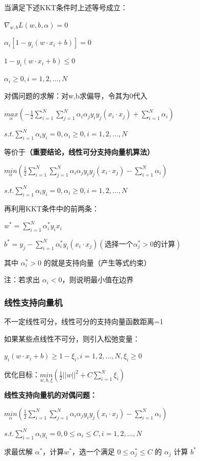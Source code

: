 \documentclass[b4paper, 10pt]{ctexart}
\begin{document}
\begin{multicols}{3}
当满足下述KKT条件时上述等号成立：

$\nabla_{w,b} L(w,b,\alpha) = 0$

$\alpha_i[1-y_i(w\cdot x_i+b)]=0$

$1-y_i(w\cdot x_i+b)\le 0$

$\alpha_i \ge 0, i=1,2,\dots,N$


对偶问题的求解：对w,b求偏导，令其为0代入

$
\underset{\alpha}{max} (-\frac{1}{2}\sum_{i=1}^N \sum_{j=1}^N \alpha_i \alpha_j y_iy_j (x_i\cdot x_j) + \sum_{i=1}^N \alpha_i
)$

$
s.t. \sum_{i=1}^N \alpha_iy_i=0, \alpha_i\ge 0,i=1,2,\dots,N
$

等价于\textbf{（重要结论，线性可分支持向量机算法）}

$
\underset{\alpha}{min} (\frac{1}{2}\sum_{i=1}^N \sum_{j=1}^N \alpha_i \alpha_j y_iy_j (x_i\cdot x_j) - \sum_{i=1}^N \alpha_i
)$

$
s.t. \sum_{i=1}^N \alpha_iy_i=0, \alpha_i\ge 0,i=1,2,\dots,N
$

再利用KKT条件中的前两条：

$
w^* = \sum_{i=1}^N \alpha^*_iy_ix_i
$

$
b^* = y_j - \sum_{i=1}^N \alpha_i^* y_i (x_i \cdot x_j) (\mbox{选择一个}\alpha^*_j>0\mbox{的计算})
$

其中 $\alpha_i^*>0$ 的就是支持向量（产生等式约束）

注：若求出 $\alpha_i<0$，则说明最小值在边界

\subsubsection{线性支持向量机}
不一定线性可分，线性可分的支持向量函数距离=1

如果某些点线性不可分，则引入松弛变量：

$y_i(w\cdot x_i+b)\ge 1-\xi_i, i=1,2,\dots,N,\xi_i\ge 0$

优化目标：$\underset{w,b,\xi}{min} (\frac{1}{2} ||w||^2 + C\sum_{i=1}^N \xi_i)$

\textbf{线性支持向量机的对偶问题：}

$
\underset{\alpha}{min} (\frac{1}{2}\sum_{i=1}^N \sum_{j=1}^N \alpha_i \alpha_j y_iy_j (x_i\cdot x_j) - \sum_{i=1}^N \alpha_i
)$

$
s.t. \sum_{i=1}^N \alpha_iy_i=0, 0\le \alpha_i\le C,i=1,2,\dots,N
$

求最优解 $\alpha^*$，计算$w^*$，选一个满足 $0\le \alpha_j^* \le C$ 的 $\alpha_j$ 计算 $b^*$


\end{multicols}
\end{document}
